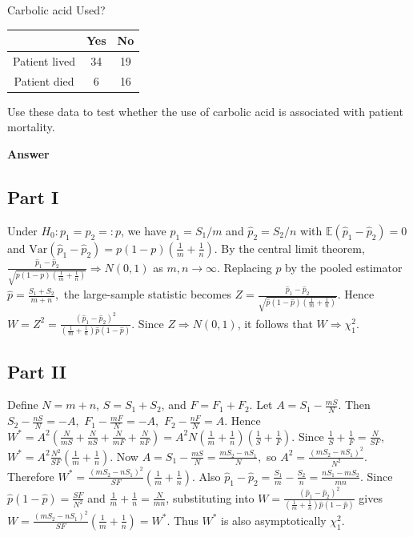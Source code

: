 \documentclass[letterpaper]{article}
\begin{document}
\begin{enumerate}
		\begin{center}
			Carbolic acid Used?
			
			\begin{tabular}{c|c|c}
				& Yes & No \\
				\hline
				Patient lived & 34 & 19 \\
				Patient died & 6 & 16
			\end{tabular}
		\end{center}
		
		Use these data to test whether the use of carbolic acid is associated with patient mortality.
		
	\end{enumerate}
	
	
	\textbf{Answer}
	
	
	\subsection{Part I}
	Under $H_0:p_1=p_2=:p$, we have $\hat p_1=S_1/m$ and $\hat p_2=S_2/n$ with
	$\mathbb E(\hat p_1-\hat p_2)=0$ and
	$\mathrm{Var}(\hat p_1-\hat p_2)=p(1-p)\left(\frac1m+\frac1n\right)$.
	By the central limit theorem,
	$
	\frac{\hat p_1-\hat p_2}
	{\sqrt{p(1-p)\left(\frac1m+\frac1n\right)}}
	\Rightarrow N(0,1)
	$
	as $m,n\to\infty$.
	Replacing $p$ by the pooled estimator
	$
	\hat p=\frac{S_1+S_2}{m+n},
	$
	the large-sample statistic becomes
	$
	Z=\frac{\hat p_1-\hat p_2}
	{\sqrt{\hat p(1-\hat p)\left(\frac1m+\frac1n\right)}}.
	$
	Hence
	$
	W=Z^2=\frac{(\hat p_1-\hat p_2)^2}
	{\left(\frac1m+\frac1n\right)\hat p(1-\hat p)}.
	$
	Since $Z\Rightarrow N(0,1)$, it follows that $W\Rightarrow\chi^2_1$.
	\clearpage
	\subsection{Part II}
	
	Define $N=m+n$, $S=S_1+S_2$, and $F=F_1+F_2$.
	Let $A=S_1-\frac{mS}{N}$. Then
	$
	S_2-\frac{nS}{N}=-A,
	$
	$
	F_1-\frac{mF}{N}=-A,
	$
	$
	F_2-\frac{nF}{N}=A.
	$
	Hence
	$
	W^*=A^2\!\left(\frac{N}{mS}+\frac{N}{nS}+\frac{N}{mF}+\frac{N}{nF}\right)
	= A^2N\!\left(\frac1m+\frac1n\right)\!\left(\frac1S+\frac1F\right).
	$
	Since $\frac1S+\frac1F=\frac{N}{SF}$,
	$
	W^*=A^2\frac{N^2}{SF}\left(\frac1m+\frac1n\right).
	$
	Now
	$
	A=S_1-\frac{mS}{N}=\frac{mS_2-nS_1}{N},
	$
	so
	$
	A^2=\frac{(mS_2-nS_1)^2}{N^2}.
	$
	Therefore
	$
	W^*=\frac{(mS_2-nS_1)^2}{SF}\left(\frac1m+\frac1n\right).
	$
	Also
	$
	\hat p_1-\hat p_2=\frac{S_1}{m}-\frac{S_2}{n}
	=\frac{nS_1-mS_2}{mn}.
	$
	Since $\hat p(1-\hat p)=\frac{SF}{N^2}$ and
	$\frac1m+\frac1n=\frac{N}{mn}$, substituting into
	$
	W=\frac{(\hat p_1-\hat p_2)^2}
	{\left(\frac1m+\frac1n\right)\hat p(1-\hat p)}
	$
	gives
	$
	W=\frac{(mS_2-nS_1)^2}{SF}\left(\frac1m+\frac1n\right)=W^*.
	$
	Thus $W^*$ is also asymptotically $\chi^2_1$.
	\clearpage
\end{document}
